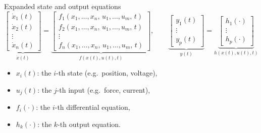 \documentclass[aspectratio=169,10pt]{beamer}
\begin{document}
\begin{frame}{Expanded state and output equations}
\[
\underbrace{
\begin{bmatrix}
\dot{x}_1(t)\\
\dot{x}_2(t)\\
\vdots\\
\dot{x}_n(t)
\end{bmatrix}}_{\dot{x}(t)}
\!=\!
\underbrace{
\begin{bmatrix}
f_1(x_1,\dots,x_n,\,u_1,\dots,u_m,\,t)\\
f_2(x_1,\dots,x_n,\,u_1,\dots,u_m,\,t)\\
\vdots\\
f_n(x_1,\dots,x_n,\,u_1,\dots,u_m,\,t)
\end{bmatrix}}_{f(x(t),u(t),t)},
\qquad
\underbrace{
\begin{bmatrix}
y_1(t)\\
\vdots\\
y_p(t)
\end{bmatrix}}_{y(t)}
\!=\!
\underbrace{
\begin{bmatrix}
h_1(\cdot)\\
\vdots\\
h_p(\cdot)
\end{bmatrix}}_{h(x(t),u(t),t)}
\]

\begin{itemize}
  \item $x_i(t)$: the $i$-th state (e.g.\ position, voltage),
  \item $u_j(t)$: the $j$-th input (e.g.\ force, current),
  \item $f_i(\cdot)$: the $i$-th differential equation,
  \item $h_k(\cdot)$: the $k$-th output equation.
\end{itemize}
\end{frame}
\end{document}

